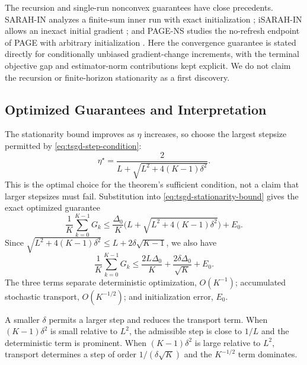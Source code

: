 The recursion and single-run nonconvex guarantees have close
precedents. SARAH-IN analyzes a finite-sum inner run with exact
initialization \citep{nguyen2017sarah_nonconvex}; iSARAH-IN allows an
inexact initial gradient \citep{nguyen2021inexact}; and PAGE-NS studies
the no-refresh endpoint of PAGE with arbitrary initialization
\citep{sokolov2022nonconvex}. Here the convergence guarantee is stated
directly for conditionally unbiased gradient-change increments, with
the terminal objective gap and estimator-norm contributions kept
explicit. We do not claim the recursion or finite-horizon stationarity
as a first discovery.

\subsection{Optimized Guarantees and Interpretation}
\label{subsec:optimized-tsgd-guarantees}

The stationarity bound improves as $\eta$ increases, so choose the
largest stepsize permitted by \eqref{eq:tsgd-step-condition}:
\begin{equation}
\label{eq:tsgd-optimal-step}
\boxed{\eta^\star
=\frac{2}{L+\sqrt{L^2+4(K-1)\delta^2}}.}
\end{equation}
This is the optimal choice for the theorem's sufficient condition, not
a claim that larger stepsizes must fail. Substitution into
\eqref{eq:tsgd-stationarity-bound} gives the exact optimized guarantee
\begin{equation}
\label{eq:tsgd-optimized-bound}
\frac1K\sum_{k=0}^{K-1}G_k
\leq
\frac{\Delta_0}{K}
\bigl(L+\sqrt{L^2+4(K-1)\delta^2}\bigr)+E_0.
\end{equation}
Since
$\sqrt{L^2+4(K-1)\delta^2}\leq L+2\delta\sqrt{K-1}$, we also have
\begin{equation}
\label{eq:tsgd-simplified-bound}
\boxed{\frac1K\sum_{k=0}^{K-1}G_k
\leq
\frac{2L\Delta_0}{K}
+\frac{2\delta\Delta_0}{\sqrt K}
+E_0.}
\end{equation}
The three terms separate deterministic optimization,
$O(K^{-1})$; accumulated stochastic transport, $O(K^{-1/2})$; and
initialization error, $E_0$.

A smaller $\delta$ permits a larger step and reduces the transport
term. When $(K-1)\delta^2$ is small relative to $L^2$, the admissible
step is close to $1/L$ and the deterministic term is prominent. When
$(K-1)\delta^2$ is large relative to $L^2$, transport determines a step
of order $1/(\delta\sqrt K)$ and the $K^{-1/2}$ term dominates.

